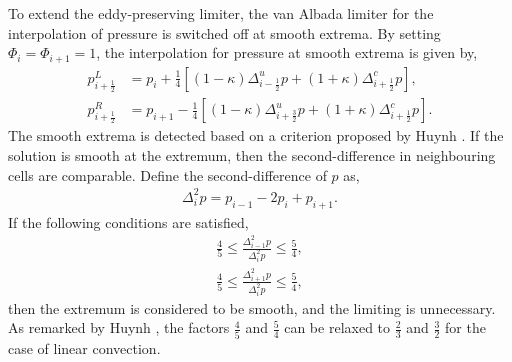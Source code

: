To extend the eddy-preserving limiter, the van Albada limiter for the interpolation of pressure is switched off at smooth extrema. By setting $\Phi_{i}=\Phi_{i+1}=1$, the interpolation for pressure at smooth extrema is given by,
\begin{align} 
p_{i+\frac{1}{2}}^{L}&=p_{i}+\frac{1}{4}[(1-\kappa )\Delta _{i-\frac{1}{2}}^{u} p+(1+\kappa)\Delta _{i+\frac{1}{2}}^{c} p], \\
p_{i+\frac{1}{2}}^{R}&=p_{i+1}-\frac{1}{4}[(1-\kappa )\Delta _{i+\frac{3}{2}}^{u} p+(1+\kappa)\Delta _{i+\frac{1}{2}}^{c} p].
\end{align}
The smooth extrema is detected based on a criterion proposed by Huynh \cite{huynh1995accurate}. If the solution is smooth at the extremum, then the second-difference in neighbouring cells are comparable. Define the second-difference of $p$ as,
\begin{align} 
\Delta _{i}^{2} p = p_{i-1}-2p_{i}+p_{i+1}.
\end{align}
If the following conditions are satisfied,
\begin{align} 
\frac{4}{5}\le \frac{{\Delta} _{i-1}^{2} p}{{\Delta} _{i}^{2} p}\le \frac{5}{4}, \\
\frac{4}{5}\le \frac{{\Delta} _{i+1}^{2} p}{{\Delta} _{i}^{2} p}\le \frac{5}{4}, 
\end{align}
then the extremum is considered to be smooth, and the limiting is unnecessary. As remarked by Huynh \cite{huynh1995accurate}, the factors $\frac{4}{5}$ and $\frac{5}{4}$ can be relaxed to $\frac{2}{3}$ and $\frac{3}{2}$ for the case of linear convection.
